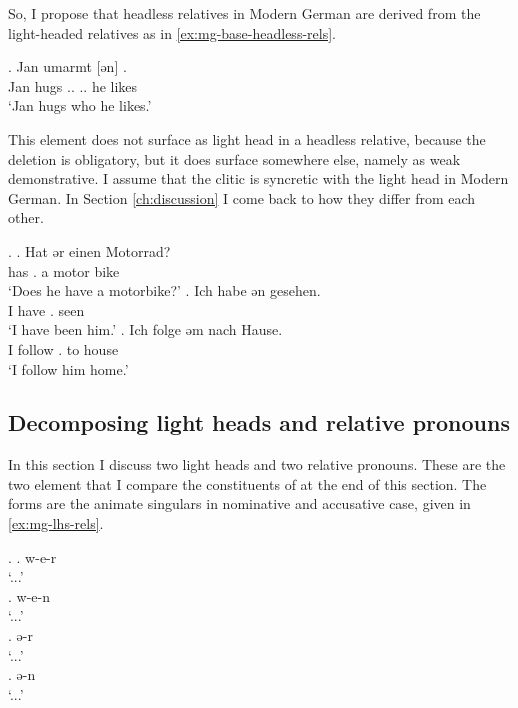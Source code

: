 
So, I propose that headless relatives in Modern German are derived from the light-headed relatives as in \ref{ex:mg-base-headless-rels}.

\exg. Jan umarmt [ən]   .\\
Jan hugs .. .. he likes\\
`Jan hugs who he likes.'\label{ex:mg-base-headless-rels}


This element does not surface as light head in a headless relative, because the deletion is obligatory, but it does surface somewhere else, namely as weak demonstrative. I assume that the clitic is syncretic with the light head in Modern German. In Section \ref{ch:discussion} I come back to how they differ from each other.

\ex.
\ag. Hat ər einen Motorrad?\\
 has . a motor bike\\
 `Does he have a motorbike?'
\bg. Ich habe ən gesehen.\\
 I have . seen\\
 `I have been him.'
\bg. Ich folge əm nach Hause.\\
 I follow . to house\\
 `I follow him home.'

\subsection{Decomposing light heads and relative pronouns}

In this section I discuss two light heads and two relative pronouns. These are the two element that I compare the constituents of at the end of this section. The forms are the animate singulars in nominative and accusative case, given in \ref{ex:mg-lhs-rels}.

\ex.\label{ex:mg-lhs-rels}
\ag. w-e-r\\
 `...'\\
\bg. w-e-n\\
 `...'\\
\bg. ə-r\\
 `...'\\
\bg. ə-n\\
 `...'\\

